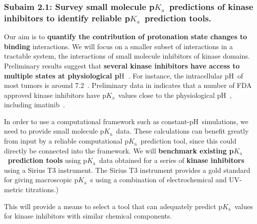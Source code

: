 \documentclass[10pt,final]{article}
\newcommand{\pKa}{p$K_\mathrm{a}$\ }
\newcommand{\pH}{p$\mathrm{H}$\ }
\begin{document}
\subsubsection*{Subaim 2.1: Survey small molecule \pKa predictions of kinase inhibitors to identify reliable \pKa prediction tools.}

Our aim is to \textbf{quantify the contribution of protonation state changes to binding} interactions.
%
We will focus on a smaller subset of interactions in a tractable system, the interactions of small molecule inhibitors of kinase domains.
%
Preliminary results suggest that \textbf{several kinase inhibitors have access to multiple states  at physiological \pH}.
%
For instance, the intracellular \pH of most tumors is around 7.2~\cite{Griffiths1991a,Stubbs2000a}.
%
Preliminary data in  indicates that a number of FDA approved kinase inhibitors have \pKa values close to the physiological \pH, including imatinib~\cite{Szakacs2005a}.

In order to use a computational framework such as constant-\pH simulations, we need to provide small molecule \pKa data.
%
These calculations can benefit greatly from input by a reliable computational \pKa prediction tool, since this could directly be connected into the framework.
%
We will \textbf{benchmark existing \pKa prediction tools}  using \pKa data obtained for a series of \textbf{kinase inhibitors} using a Sirius T3 instrument.
%
The Sirius T3 instrument provides a gold standard for giving macroscopic \pKa{}s using a combination of electrochemical and UV-metric titrations.)

This will provide a means to select a tool that can adequately predict \pKa values for kinase inhibitors with similar chemical components.
\end{document}
